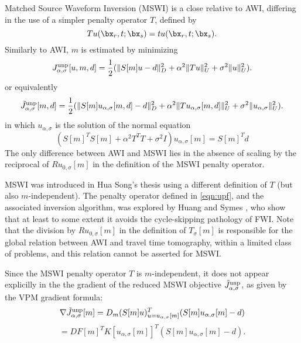 Matched Source Waveform Inversion (MSWI) is a close relative to
AWI, differing in the use of a simpler penalty operator $T$, defined
by
\begin{equation}
  \label{eqn:upf}
  Tu (\bx_r,t;\bx_s) = t u(\bx_r,t;\bx_s).
\end{equation}
Similarly to AWI, $m$ is estimated by minimizing
\begin{equation}
  \label{eqn:junp}
 J^{\rm unp}_{\alpha,\sigma}[u,m,d] = \frac{1}{2}(\|S[m]u - d\|_D^2 + \alpha^2\|Tu\|_U^2 + \sigma^2 \|u\|^2_U).
\end{equation}
or equivalently
\begin{equation}
  \label{eqn:jtildeunp}
 \tilde{J}^{\rm unp}_{\alpha,\sigma}[m,d] = \frac{1}{2}(\|S[m]u_{\alpha,\sigma}[m,d] - d\|_D^2 + \alpha^2\|Tu_{\alpha,\sigma}[m,d]\|_U^2 + \sigma^2 \|u_{\alpha,\sigma}\|^2_U).
\end{equation}
in which $u_{\alpha,\sigma}$ is the solution of the normal equation
\begin{equation}
  \label{eqn:normalunp}
  (S[m]^TS[m] + \alpha^2T^TT + \sigma^2I)u_{\alpha,\sigma}[m] = S[m]^Td
\end{equation}
The only difference between AWI and MSWI lies in the absence of
scaling by the reciprocal of $Ru_{0,\sigma}[m]$ in the definition of the MSWI
penalty operator.

MSWI was introduced in Hua Song's thesis
\cite[]{Song:94c} using a different definition of $T$ (but also
$m$-independent). The penalty operator defined in \ref{eqn:upf}, and
the associated inversion algorithm, was explored by Huang and Symes
\cite[]{HuangSymes2015SEG,HuangSymes:Geo17}, who show that at least to
some extent it avoids the cycle-skipping pathology of FWI. Note that
the division by $Ru_{0,\sigma}[m]$ in the definition of
$T_{\sigma}[m]$ is responsible for the global relation between AWI and
travel time tomography, within a limited class of problems, and this
relation cannot be asserted for MSWI.

Since the MSWI penalty operator $T$ is $m$-independent, it does not
appear explicilly in the the gradient
of the reduced MSWI objective $\tilde{J}^{\rm unp}_{\alpha,\sigma}$, as
given by the VPM gradient formula:
\[
  \nabla \tilde{J}^{\rm unp}_{\alpha,\sigma}[m] =
  D_m(S[m]u)^T_{u=u_{\alpha,\sigma}[m]}(S[m]u_{\alpha,\sigma}[m]-d)
\]
\begin{equation}
  \label{eqn:tildejunpgrad}
  = DF[m]^TK[u_{\alpha,\sigma}[m]]^T(S[m]u_{\alpha,\sigma}[m]-d).
\end{equation}

